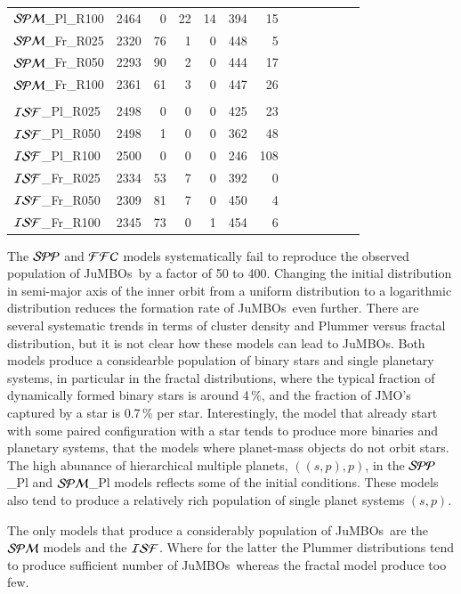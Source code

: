 \documentclass[submission,phys]{lib/SciPost}
\newcommand{\jumbos}{\mbox{JuMBOs}}
\begin{document}
\begin{table}
\begin{tabular}{lrrrrrrrrrrrr}
${\cal SPM}$\_Pl\_R100 &  2464 &  0 & 22 & 14 & 394 & 15 \\
${\cal SPM}$\_Fr\_R025 &  2320 & 76 &  1 &  0 & 448 &  5 \\ 
${\cal SPM}$\_Fr\_R050 &  2293 & 90 &  2 &  0 & 444 & 17 \\
${\cal SPM}$\_Fr\_R100 &  2361 & 61 &  3 &  0 & 447 & 26 \\
  \hline
  \hline \vspace{-0.75em}\\
${\cal ISF}$\_Pl\_R025 &  2498 & 0 & 0 & 0 & 425 & 23 \\
${\cal ISF}$\_Pl\_R050 &  2498 & 1 & 0 & 0 & 362 & 48 \\
${\cal ISF}$\_Pl\_R100 &  2500 & 0 & 0 & 0 & 246 & 108 \\
${\cal ISF}$\_Fr\_R025 &  2334 & 53 & 7 & 0 & 392 & 0 \\
${\cal ISF}$\_Fr\_R050 &  2309 & 81 & 7 & 0 & 450 & 4 \\
${\cal ISF}$\_Fr\_R100 &  2345 & 73 & 0 & 1 & 454 & 6 \\
  \hline
 \end{tabular}
\end{table}

The ${\cal SPP}$ and ${\cal FFC}$ models systematically fail to
reproduce the observed population of \jumbos\, by a factor of 50 to
400. Changing the initial distribution in semi-major axis of the inner
orbit from a uniform distribution to a logarithmic distribution
reduces the formation rate of \jumbos\, even further.  There are
several systematic trends in terms of cluster density and Plummer
versus fractal distribution, but it is not clear how these models can
lead to \jumbos. Both models produce a considearble population of
binary stars and single planetary systems, in particular in the
fractal distributions, where the typical fraction of dynamically
formed binary stars is around 4\,\%, and the fraction of JMO's
captured by a star is 0.7\,\% per star.  Interestingly, the model that
already start with some paired configuration with a star tends to
produce more binaries and planetary systems, that the models where
planet-mass objects do not orbit stars.  The high abunance of
hierarchical multiple planets, $((s,p),p)$, in the ${\cal SPP}$\_Pl
and ${\cal SPM}$\_Pl models reflects some of the initial
conditions. These models also tend to produce a relatively rich
population of single planet systems $(s,p)$.

The only models that produce a considerably population of \jumbos\,
are the ${\cal SPM}$ models and the ${\cal ISF}$. Where for the latter
the Plummer distributions tend to produce sufficient number of
\jumbos\, whereas the fractal model produce too few.
\end{document}
